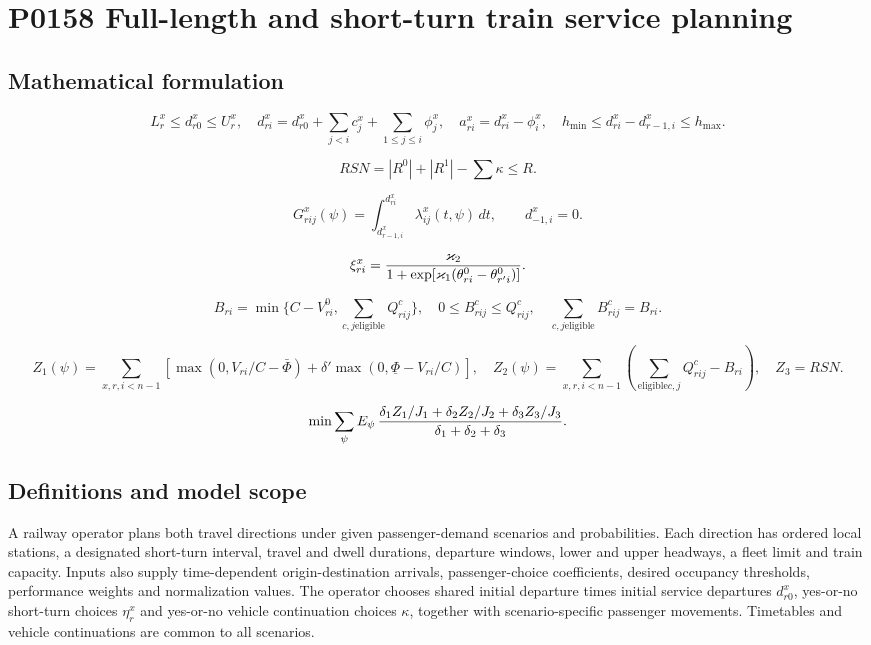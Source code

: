 \documentclass[10pt]{article}
\begin{document}
\section*{P0158 Full-length and short-turn train service planning}
\subsection*{Mathematical formulation}
\[
L_r^x\le d_{r0}^x\le U_r^x,\quad
d_{ri}^x=d_{r0}^x+\sum_{j<i}c_j^x+\sum_{1\le j\le i}\phi_j^x,\quad
a_{ri}^x=d_{ri}^x-\phi_i^x,\quad
h_{\min}\le d_{ri}^x-d_{r-1,i}^x\le h_{\max}.
\]

\[
RSN=|R^0|+|R^1|-\sum\kappa\le R.
\]

\[
G^x_{rij}(\psi)=\int_{d^x_{r-1,i}}^{d^x_{ri}}\lambda^x_{ij}(t,\psi)\,dt,\qquad
d^x_{-1,i}=0.
\]

\[
\xi^x_{ri}={\varkappa_2\over1+\exp[\varkappa_1(\theta^0_{ri}-\theta^0_{r'i})]}.
\]

\[
B_{ri}=\min\{C-V^0_{ri},\sum_{c,j\text{eligible}}Q^c_{rij}\},\quad
0\le B^c_{rij}\le Q^c_{rij},\quad
\sum_{c,j\text{eligible}}B^c_{rij}=B_{ri}.
\]

\[
Z_1(\psi)=\sum_{x,r,i<n-1}[\max(0,V_{ri}/C-\bar\Phi)
+\delta'\max(0,\underline\Phi-V_{ri}/C)],
\quad Z_2(\psi)=\sum_{x,r,i<n-1}(\sum_{\text{eligible}c,j}Q^c_{rij}-B_{ri}),\quad Z_3=RSN.
\]

\[
\min\sum_\psi E_\psi\,
{\delta_1Z_1/J_1+\delta_2Z_2/J_2+\delta_3Z_3/J_3\over\delta_1+\delta_2+\delta_3}.
\]

\subsection*{Definitions and model scope}
A railway operator plans both travel directions under given passenger-demand scenarios and probabilities. Each direction has ordered local stations, a designated short-turn interval, travel and dwell durations, departure windows, lower and upper headways, a fleet limit and train capacity. Inputs also supply time-dependent origin-destination arrivals, passenger-choice coefficients, desired occupancy thresholds, performance weights and normalization values. The operator chooses shared initial departure times initial service departures $d_{r0}^x$, yes-or-no short-turn choices $\eta_r^x$ and yes-or-no vehicle continuation choices $\kappa$, together with scenario-specific passenger movements. Timetables and vehicle continuations are common to all scenarios.
\end{document}
